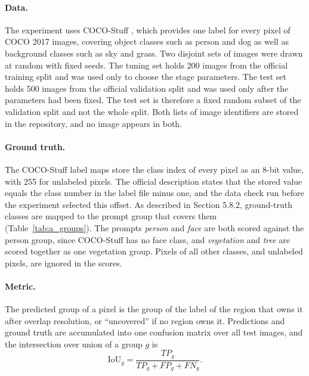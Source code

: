 \documentclass{FastFyp}
\begin{document}
\paragraph{Data.} The experiment uses COCO-Stuff \cite{caesar2018cocostuff}, which provides one label for every pixel of COCO 2017 images, covering object classes such as person and dog as well as background classes such as sky and grass. Two disjoint sets of images were drawn at random with fixed seeds. The tuning set holds 200 images from the official training split and was used only to choose the stage parameters. The test set holds 500 images from the official validation split and was used only after the parameters had been fixed. The test set is therefore a fixed random subset of the validation split and not the whole split. Both lists of image identifiers are stored in the repository, and no image appears in both.
 
\paragraph{Ground truth.} The COCO-Stuff label maps store the class index of every pixel as an 8-bit value, with 255 for unlabeled pixels. The official description states that the stored value equals the class number in the label file minus one, and the data check run before the experiment selected this offset. As described in Section 5.8.2, ground-truth classes are mapped to the prompt group that covers them (Table~\ref{tab:a_groups}). The prompts \textit{person} and \textit{face} are both scored against the person group, since COCO-Stuff has no face class, and \textit{vegetation} and \textit{tree} are scored together as one vegetation group. Pixels of all other classes, and unlabeled pixels, are ignored in the scores.
 
\paragraph{Metric.} The predicted group of a pixel is the group of the label of the region that owns it after overlap resolution, or ``uncovered'' if no region owns it. Predictions and ground truth are accumulated into one confusion matrix over all test images, and the intersection over union of a group $g$ is
\begin{equation}
\mathrm{IoU}_g=\frac{TP_g}{TP_g+FP_g+FN_g}.
\label{eq:a_iou}
\end{equation}
\end{document}
